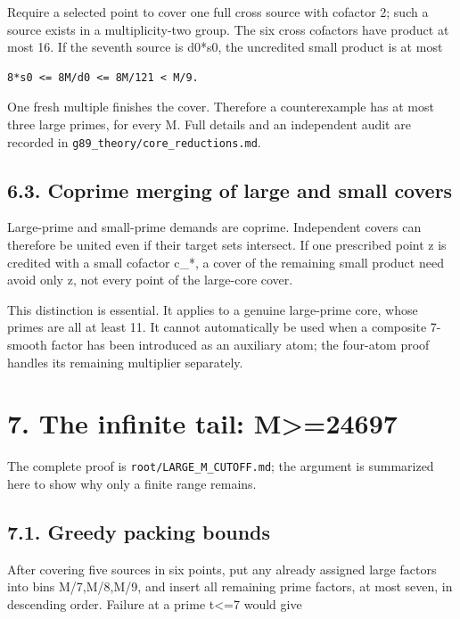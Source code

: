 \documentclass[11pt,a4paper]{article}
\begin{document}
Require a selected point to cover one full cross source with cofactor 2;
such a source exists in a multiplicity-two group. The six cross
cofactors have product at most 16. If the seventh source is d0*s0, the
uncredited small product is at most

\begin{verbatim}
8*s0 <= 8M/d0 <= 8M/121 < M/9.
\end{verbatim}

One fresh multiple finishes the cover. Therefore a counterexample has at
most three large primes, for every M. Full details and an independent
audit are recorded in \nolinkurl{g89_theory/core_reductions.md}.

\subsection{6.3. Coprime merging of large and small
covers}\label{coprime-merging-of-large-and-small-covers}

Large-prime and small-prime demands are coprime. Independent covers can
therefore be united even if their target sets intersect. If one
prescribed point z is credited with a small cofactor c\_*, a cover of
the remaining small product need avoid only z, not every point of the
large-core cover.

This distinction is essential. It applies to a genuine large-prime core,
whose primes are all at least 11. It cannot automatically be used when a
composite 7-smooth factor has been introduced as an auxiliary atom; the
four-atom proof handles its remaining multiplier separately.

\section{7. The infinite tail:
M\textgreater=24697}\label{the-infinite-tail-m24697}

The complete proof is \nolinkurl{root/LARGE_M_CUTOFF.md}; the argument is
summarized here to show why only a finite range remains.

\subsection{7.1. Greedy packing bounds}\label{greedy-packing-bounds}

After covering five sources in six points, put any already assigned
large factors into bins M/7,M/8,M/9, and insert all remaining prime
factors, at most seven, in descending order. Failure at a prime
t\textless=7 would give
\end{document}
